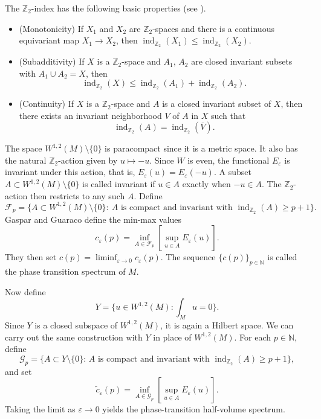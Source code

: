 \documentclass[12pt,english]{article}
\theoremstyle{definition}
\begin{document}
The $\mathbb{Z}_2$-index has the following basic properties (see \cite{FR}).
\begin{itemize}
\item[(i)] (Monotonicity) If $X_1$ and $X_2$ are $\mathbb{Z}_2$-spaces and there is a continuous equivariant map $X_1\to X_2$, then $\operatorname{ind}_{\mathbb{Z}_2}(X_1) \le \operatorname{ind}_{\mathbb{Z}_2}(X_2)$.

\item[(ii)] (Subadditivity) If $X$ is a $\mathbb{Z}_2$-space and $A_1$, $A_2$ are closed invariant subsets with $A_1\cup A_2 = X$, then
\[
\operatorname{ind}_{\mathbb{Z}_2}(X) \le \operatorname{ind}_{\mathbb{Z}_2}(A_1) + \operatorname{ind}_{\mathbb{Z}_2}(A_2).
\]

\item[(iii)] (Continuity) If $X$ is a $\mathbb{Z}_2$-space and $A$ is a closed invariant subset of $X$, then there exists an invariant neighborhood $V$ of $A$ in $X$ such that
\[
\operatorname{ind}_{\mathbb{Z}_2}(A) = \operatorname{ind}_{\mathbb{Z}_2}(\overline V).
\]
\end{itemize}

The space $W^{1,2}(M)\setminus \{0\}$ is paracompact since it is a metric space. It also has the natural $\mathbb{Z}_2$-action given by $u\mapsto -u$. Since $W$ is even, the functional $E_\varepsilon$ is invariant under this action, that is, $E_\varepsilon(u) = E_\varepsilon(-u)$. A subset $A\subset W^{1,2}(M)\setminus\{0\}$ is called invariant if $u\in A$ exactly when $-u\in A$. The $\mathbb{Z}_2$-action then restricts to any such $A$. Define
\[
\mathcal F_p = \{A\subset W^{1,2}(M)\setminus\{0\}:\ A\text{ is compact and invariant with } \operatorname{ind}_{\mathbb{Z}_2}(A) \ge p+1\}.
\]
Gaspar and Guaraco \cite{GG2} define the min-max values
\[
c_\varepsilon(p) = \inf_{A\in \mathcal F_p} \left[\sup_{u\in A} E_\varepsilon(u)\right].
\]
They then set $c(p) = \liminf_{\varepsilon\to 0} c_\varepsilon(p)$. The sequence $\{c(p)\}_{p\in \mathbb{N}}$ is called the phase transition spectrum of $M$.

Now define
\[
Y = \{u\in W^{1,2}(M): \int_M u = 0\}.
\]
Since $Y$ is a closed subspace of $W^{1,2}(M)$, it is again a Hilbert space. We can carry out the same construction with $Y$ in place of $W^{1,2}(M)$. For each $p\in \mathbb{N}$, define
\[
\mathcal G_p = \{A\subset Y\setminus\{0\}:\, A \text{ is compact and invariant with } \operatorname{ind}_{\mathbb{Z}_2}(A) \ge p+1\},
\]
and set
\[
\tilde c_\varepsilon(p) = \inf_{A\in \mathcal G_p}\left[\sup_{u\in A} E_\varepsilon(u)\right].
\]
Taking the limit as $\varepsilon \to 0$ yields the phase-transition half-volume spectrum.
\end{document}
